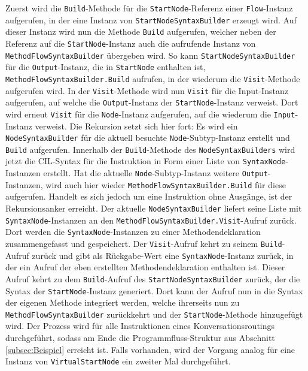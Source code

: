 \noindent Zuerst wird die \texttt{Build}-Methode für die \texttt{StartNode}-Referenz einer \texttt{Flow}-Instanz aufgerufen, in der eine Instanz von \texttt{StartNodeSyntaxBuilder} erzeugt wird. Auf dieser Instanz wird nun die Methode \texttt{Build} aufgerufen, welcher neben der Referenz auf die \texttt{StartNode}-Instanz auch die aufrufende Instanz von \texttt{Meth\-od\-Flow\-Syn\-tax\-Buil\-der} übergeben wird. So kann \texttt{StartNodeSyntaxBuilder} für die \texttt{Output}-Instanz, die in \texttt{StartNode} enthalten ist, \texttt{MethodFlowSyntaxBuilder.Build} aufrufen, in der wiederum die \texttt{Visit}-Methode aufgerufen wird. In der \texttt{Visit}-Methode wird nun \texttt{Visit} für die Input-Instanz aufgerufen, auf welche die \texttt{Output}-Instanz der \texttt{Start\-Node}-Instanz verweist. Dort wird erneut \texttt{Visit} für die \texttt{Node}-Instanz aufgerufen, auf die wiederum die \texttt{Input}-Instanz verweist. Die Rekursion setzt sich hier fort: Es wird ein \texttt{NodeSyntaxBuilder} für die aktuell besuchte \texttt{Node}-Subtyp-Instanz erstellt und \texttt{Build} aufgerufen. Innerhalb der \texttt{Build}-Methode des \texttt{NodeSyntaxBuilders} wird jetzt die CIL-Syntax für die Instruktion in Form einer Liste von \texttt{SyntaxNode}-Instanzen erstellt. Hat die aktuelle \texttt{Node}-Subtyp-Instanz weitere \texttt{Output}-Instanzen, wird auch hier wieder \texttt{Meth\-od\-Flow\-Syn\-tax\-Buil\-der.Build} für diese aufgerufen. Handelt es sich jedoch um eine Instruktion ohne Ausgänge, ist der Rekursionsanker erreicht. Der aktuelle \texttt{NodeSyntaxBuilder} liefert seine Liste mit \texttt{SyntaxNode}-Instanzen an den \texttt{Meth\-od\-Flow\-Syn\-tax\-Buil\-der.Visit}-Aufruf zurück. Dort werden die \texttt{SyntaxNode}-Instanzen zu einer Methodendeklaration zusammengefasst und gespeichert. Der \texttt{Visit}-Aufruf kehrt zu seinem \texttt{Build}-Aufruf zurück und gibt als Rückgabe-Wert eine \texttt{SyntaxNode}-Instanz zurück, in der ein Aufruf der eben erstellten Methodendeklaration enthalten ist. Dieser Aufruf kehrt zu dem \texttt{Build}-Aufruf des \texttt{StartNodeSyntaxBuilder} zurück, der die Syntax der \texttt{StartNode}-Instanz generiert. Dort kann der Aufruf nun in die Syntax der eigenen Methode integriert werden, welche ihrerseits nun zu \texttt{Me\-thod\-Flow\-Syn\-tax\-Builder} zurückkehrt und der \texttt{StartNode}-Methode hinzugefügt wird. Der Prozess wird für alle Instruktionen eines Konversationsroutings durchgeführt, sodass am Ende die Programmfluss-Struktur aus Abschnitt \ref{subsec:Beispiel} erreicht ist. Falls vorhanden, wird der Vorgang analog für eine Instanz von \texttt{VirtualStartNode} ein zweiter Mal durchgeführt.

